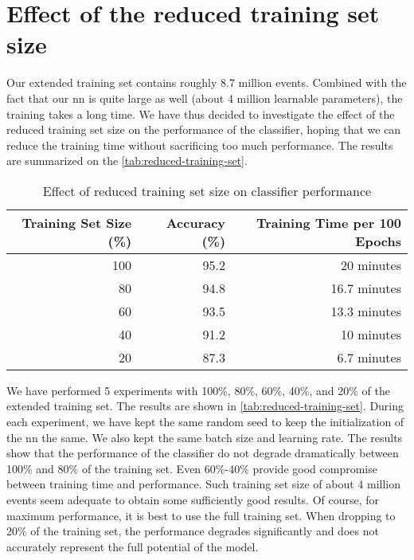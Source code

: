 \section{Effect of the reduced training set size}

Our extended training set contains roughly 8.7 million events. Combined with the fact that our \gls{nn} is quite large
as well (about 4 million learnable parameters), the training takes a long time. We have thus decided to investigate
the effect of the reduced training set size on the performance of the classifier, hoping that we can reduce the
training time without sacrificing too much performance. The results are summarized on the \autoref{tab:reduced-training-set}.


\begin{table}[htbp]
    \centering
    \begin{tabular}{rrr}
        \toprule
        \textbf{Training Set Size (\%)} & \textbf{Accuracy (\%)} & \textbf{Training Time per 100 Epochs} \\
        \midrule
        100                             & 95.2                   & 20 minutes                            \\
        80                              & 94.8                   & 16.7 minutes                          \\
        60                              & 93.5                   & 13.3 minutes                          \\
        40                              & 91.2                   & 10 minutes                            \\
        20                              & 87.3                   & 6.7 minutes                           \\
        \bottomrule
    \end{tabular}
    \caption{Effect of reduced training set size on classifier performance}
    \label{tab:reduced-training-set}
\end{table}

We have performed 5 experiments with 100\%, 80\%, 60\%, 40\%, and 20\% of the extended training set. The results are
shown in \autoref{tab:reduced-training-set}. During each experiment, we have kept the same random seed to keep the
initialization of the \gls{nn} the same. We also kept the same batch size and learning rate. The results show that the
performance of the classifier do not degrade dramatically between 100\% and 80\% of the training set. Even 60\%-40\%
provide good compromise between training time and performance. Such training set size of about 4 million events seem
adequate to obtain some sufficiently good results. Of course, for maximum performance, it is best to use the full
training set. When dropping to 20\% of the training set, the performance degrades significantly and does not accurately
represent the full potential of the model.

